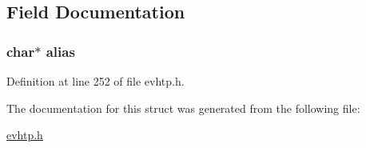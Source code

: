 \subsection{\-Field \-Documentation}
\hypertarget{structevhtp__alias__s_a9027b352db4085a0122952932d065705}{
\subsubsection[{alias}]{\setlength{\rightskip}{0pt plus 5cm}char$\ast$ {\bf alias}}}\label{structevhtp__alias__s_a9027b352db4085a0122952932d065705}


\-Definition at line 252 of file evhtp.\-h.



\-The documentation for this struct was generated from the following file\-:\begin{DoxyCompactItemize}
\item 
\hyperlink{evhtp_8h}{evhtp.\-h}\end{DoxyCompactItemize}
